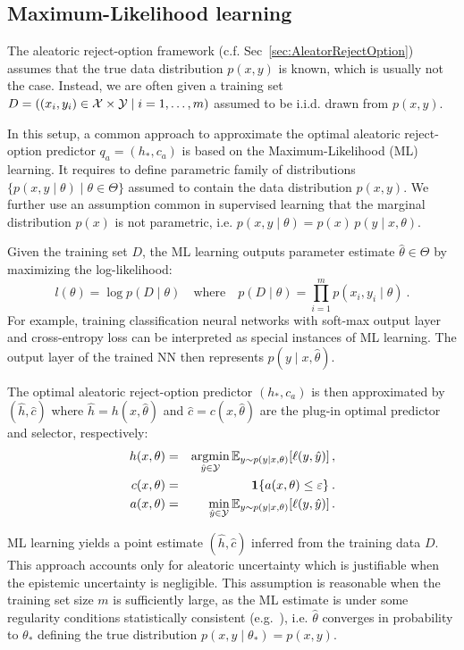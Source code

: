 \subsection{Maximum-Likelihood learning}
\label{sec:MLLearning}

The aleatoric reject-option framework (c.f. Sec~\ref{sec:AleatorRejectOption}) assumes that the true data distribution $p(x,y)$ is known, which is usually not the case. Instead, we are often given a training set $D=((x_i,y_i)\in{\cal X}\times{\cal Y}\mid i=1,\ldots,m)$ assumed to be i.i.d. drawn from $p(x,y)$. 

In this setup, a common approach to approximate the optimal aleatoric reject-option predictor $q_a=(h_*,c_a)$ is based on the Maximum-Likelihood (ML) learning. It requires to define parametric family of distributions $\{p(x,y\mid \theta )\mid \theta \in \Theta \}$ assumed to contain the data distribution $p(x,y)$. We further use an assumption common in supervised learning that the marginal distribution $p(x)$ is not parametric, i.e. $p(x,y\mid \theta)=p(x)\,p(y\mid x,\theta)$.

Given the training set $D$, the ML learning outputs parameter estimate $\hat{\theta}\in\Theta$ by maximizing the log-likelihood:
\[
  l(\theta) = \log p(D\mid \theta)\quad\text{where}\quad p(D\mid \theta) = \prod_{i=1}^m p(x_i,y_i\mid \theta) \:. 
\]
%
For example, training classification neural networks with soft-max output layer and cross-entropy loss can be interpreted as special instances of ML learning. The output layer of the trained NN then represents $p(y\mid x,\hat{\theta})$. 

The optimal aleatoric reject-option predictor $(h_*,c_a)$ is then approximated by $(\hat{h},\hat{c})$ where $\hat{h}=h(x,\hat{\theta})$ and $\hat{c}=c(x,\hat{\theta})$ are the plug-in optimal predictor and selector, respectively:
\begin{eqnarray}
   \label{equ:BayesOptimalGivenTheta}
    h(x,\theta) & = &\mathop{\rm argmin}_{\hat{y}\in{\cal Y}} {\mathbb{E}}_{y\sim p(y\mid x,\theta)}[\ell(y,\hat{y})] \,,\\
    c(x,\theta) &= &\mathbf{1}{\{ {a(x,\theta) \leq \varepsilon}\}}\:.\\
    a(x,\theta) &= &\min_{\hat{y}\in{\cal Y}} {\mathbb{E}}_{y\sim p(y\mid x,\theta)}[\ell(y,\hat{y})] \,.
\end{eqnarray}

ML learning yields a point estimate $(\hat{h},\hat{c})$ inferred from the training data $D$. This approach accounts only for aleatoric uncertainty which is justifiable when the epistemic uncertainty is negligible. This assumption is reasonable when the training set size $m$ is sufficiently large, as the ML estimate is under some regularity conditions statistically consistent (e.g.~\cite{Wackerly-2002}), i.e. $\hat{\theta}$ converges in probability to $\theta_*$ defining the true distribution $p(x,y\mid \theta_*)=p(x,y)$. 

